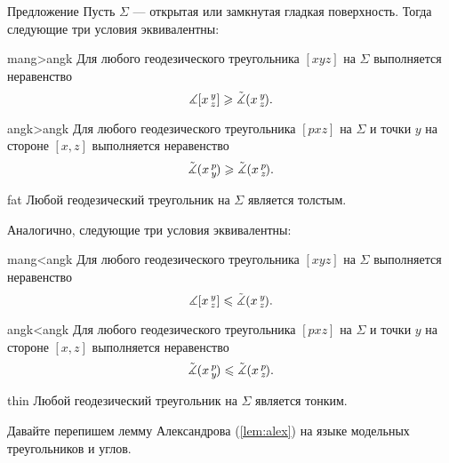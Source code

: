 \begin{thm}{Предложение}\label{prop:comp-reformulations}
Пусть $\Sigma$ --- открытая или замкнутая гладкая поверхность.
Тогда следующие три условия эквивалентны:

\begin{subthm}{mang>angk}
Для любого геодезического треугольника $[xyz]$ на $\Sigma$ выполняется неравенство
 \[\measuredangle[x\,{}^{y}_{z}]\geqslant\tilde\measuredangle(x\,{}^{y}_{z}\hspace{-0.2ex}).\]
\end{subthm}

\begin{subthm}{angk>angk} Для любого геодезического треугольника $[pxz]$ на $\Sigma$ и точки $y$ на стороне $[x,z]$ выполняется неравенство
 \[\tilde\measuredangle(x\,{}^{p}_{y}\hspace{-0.2ex}) \geqslant \tilde\measuredangle(x\,{}^{p}_{z}\hspace{-0.2ex}).\]
 
\end{subthm}

\begin{subthm}{fat}
Любой геодезический треугольник на $\Sigma$ является толстым.
\end{subthm}

\medskip

Аналогично, следующие три условия эквивалентны:

\begin{subthmA}{mang<angk}
Для любого геодезического треугольника $[xyz]$ на $\Sigma$ выполняется неравенство
 \[\measuredangle[x\,{}^{y}_{z}]\leqslant\tilde\measuredangle(x\,{}^{y}_{z}\hspace{-0.2ex}).\]
\end{subthmA}

\begin{subthmA}{angk<angk} Для любого геодезического треугольника $[pxz]$ на $\Sigma$ и точки $y$ на стороне $[x,z]$ выполняется неравенство
 \[\tilde\measuredangle(x\,{}^{p}_{y}\hspace{-0.2ex}) \leqslant \tilde\measuredangle(x\,{}^{p}_{z}\hspace{-0.2ex}).\]
\end{subthmA}

\begin{subthmA}{thin}
Любой геодезический треугольник на $\Sigma$ является тонким.
\end{subthmA}

\end{thm}

Давайте перепишем лемму Александрова (\ref{lem:alex}) на языке модельных треугольников и углов.


